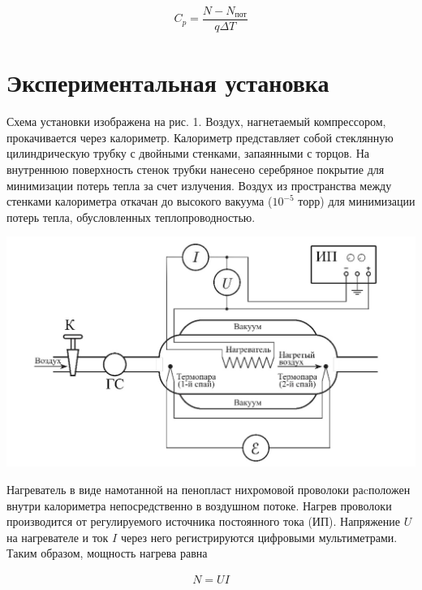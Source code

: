 \documentclass[a4paper,12pt]{article} %
\begin{document}
\begin{equation}
\begin{aligned}
C_p = \dfrac{N - N_{\text{пот}}}{q \Delta T} 
\end{aligned}
\end{equation}

\section{Экспериментальная установка}

\noindent Схема установки изображена на рис. 1. Воздух, нагнетаемый компрессором, прокачивается через калориметр. Калориметр представляет собой стеклянную цилиндрическую трубку с двойными стенками, запаянными с торцов. На внутреннюю поверхность стенок трубки нанесено серебряное покрытие для минимизации потерь тепла за счет излучения. Воздух из пространства между стенками калориметра откачан до высокого вакуума ($10^{-5}$ торр) для минимизации потерь тепла, обусловленных теплопроводностью.

\begin{center}
\includegraphics[width = 1\textwidth]{установка.jpg}
\end{center}

\noindent Нагреватель в виде намотанной на пенопласт нихромовой проволоки раcположен внутри калориметра непосредственно в воздушном потоке. Нагрев проволоки производится от регулируемого источника постоянного тока (ИП). Напряжение $U$ на нагревателе и ток $I$ через него регистрируются цифровыми мультиметрами. Таким образом, мощность нагрева равна

\begin{equation}
\begin{aligned}
N = UI 
\end{aligned}
\end{equation}
\end{document}
